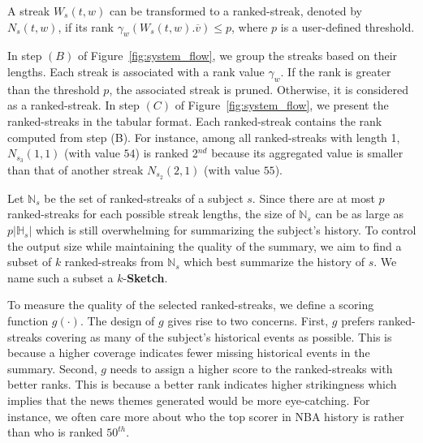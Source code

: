 \begin{definition} 
A streak $W_s(t,w)$ can be transformed to a ranked-streak, denoted by $N_s(t,w)$, if its rank $\gamma_w(W_s(t,w).\overline{v}) \leq p$, where $p$ is a user-defined threshold.
\end{definition} 

\begin{example}
In step $(B)$ of Figure~\ref{fig:system_flow}, we group the streaks based on their lengths. Each streak is associated with a rank value $\gamma_w$. If the rank is greater than the threshold $p$, the associated streak is pruned. 
Otherwise, it is considered as a ranked-streak. In step $(C)$ of  Figure~\ref{fig:system_flow}, we present the ranked-streaks in the tabular format. Each ranked-streak contains the rank computed from step (B). 
For instance, among all ranked-streaks with length 1, $N_{s_3}(1,1)$ (with value $54$) is ranked 2$^{nd}$ 
because its aggregated value is smaller than that of another streak $N_{s_2}(2,1)$ (with value $55$). %
\end{example}

Let $\mathbb{N}_s$ be the set of ranked-streaks of a subject $s$. Since there are at most $p$ ranked-streaks for each possible streak lengths, the size of $\mathbb{N}_s$ can be as large as $p|\mathbb{H}_s|$ which is still overwhelming for 
summarizing the subject's history.
To control the output size while maintaining the quality of the summary, 
we aim to find a subset of $k$ ranked-streaks
from $\mathbb{N}_s$ which best summarize the history of $s$. %
We name such a subset a $k$-\textbf{Sketch}.


To measure the quality of the selected ranked-streaks, we define a scoring 
function $g(\cdot)$. The design of $g$ gives rise to two concerns.
First, $g$ prefers ranked-streaks covering as many of the subject's historical
events as possible. This is because a higher coverage indicates fewer missing historical events in the summary.
Second, $g$ needs to assign a higher score to the ranked-streaks with better ranks. This
is because a better rank indicates higher strikingness which implies that the news themes generated would
be more eye-catching. 
For instance, 
we often care more about who the top scorer in NBA history is rather than who is ranked $50^{th}$.
%

